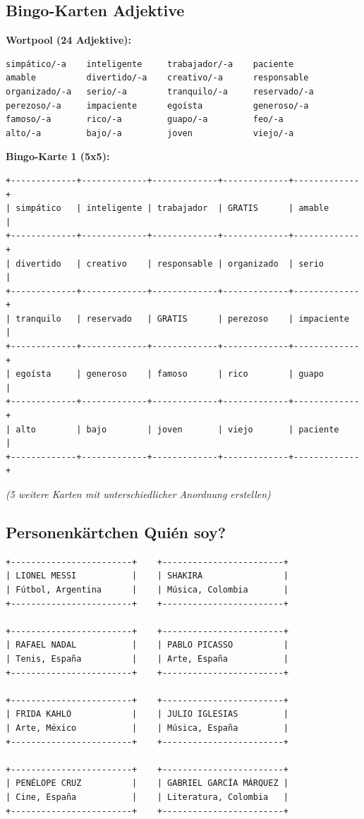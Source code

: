 \documentclass[11pt,a4paper]{article}
\begin{document}
\subsection{Bingo-Karten Adjektive}

\textbf{Wortpool (24 Adjektive):}
\begin{verbatim}
simpático/-a    inteligente     trabajador/-a    paciente
amable          divertido/-a    creativo/-a      responsable
organizado/-a   serio/-a        tranquilo/-a     reservado/-a
perezoso/-a     impaciente      egoísta          generoso/-a
famoso/-a       rico/-a         guapo/-a         feo/-a
alto/-a         bajo/-a         joven            viejo/-a
\end{verbatim}

\textbf{Bingo-Karte 1 (5x5):}
\begin{verbatim}
+-------------+-------------+-------------+-------------+-------------+
| simpático   | inteligente | trabajador  | GRATIS      | amable      |
+-------------+-------------+-------------+-------------+-------------+
| divertido   | creativo    | responsable | organizado  | serio       |
+-------------+-------------+-------------+-------------+-------------+
| tranquilo   | reservado   | GRATIS      | perezoso    | impaciente  |
+-------------+-------------+-------------+-------------+-------------+
| egoísta     | generoso    | famoso      | rico        | guapo       |
+-------------+-------------+-------------+-------------+-------------+
| alto        | bajo        | joven       | viejo       | paciente    |
+-------------+-------------+-------------+-------------+-------------+
\end{verbatim}

\textit{(5 weitere Karten mit unterschiedlicher Anordnung erstellen)}

\subsection{Personenkärtchen \glqq{}\textquestiondown{}Quién soy?\grqq{}}

\begin{verbatim}
+------------------------+    +------------------------+
| LIONEL MESSI           |    | SHAKIRA                |
| Fútbol, Argentina      |    | Música, Colombia       |
+------------------------+    +------------------------+

+------------------------+    +------------------------+
| RAFAEL NADAL           |    | PABLO PICASSO          |
| Tenis, España          |    | Arte, España           |
+------------------------+    +------------------------+

+------------------------+    +------------------------+
| FRIDA KAHLO            |    | JULIO IGLESIAS         |
| Arte, México           |    | Música, España         |
+------------------------+    +------------------------+

+------------------------+    +------------------------+
| PENÉLOPE CRUZ          |    | GABRIEL GARCÍA MÁRQUEZ |
| Cine, España           |    | Literatura, Colombia   |
+------------------------+    +------------------------+
\end{verbatim}
\end{document}
